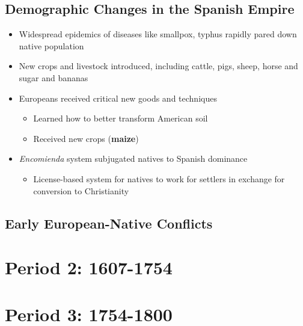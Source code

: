\documentclass{article}
\begin{document}
    \subsection{Demographic Changes in the Spanish Empire}
    \begin{itemize}
        \item Widespread epidemics of diseases like smallpox, typhus rapidly pared down native population
        \item New crops and livestock introduced, including cattle, pigs, sheep, horse and sugar and bananas
        \item Europeans received critical new goods and techniques
        \begin{itemize}
            \item Learned how to better transform American soil
            \item Received new crops (\textbf{maize})
        \end{itemize}
        \item \textit{Encomienda} system subjugated natives to Spanish dominance
        \begin{itemize}
            \item License-based system for natives to work for settlers in exchange for conversion to Christianity
        \end{itemize}
    \end{itemize}
    \subsection{Early European-Native Conflicts}

    \section{Period 2: 1607-1754}

    \section{Period 3: 1754-1800}
    
    
\end{document}
